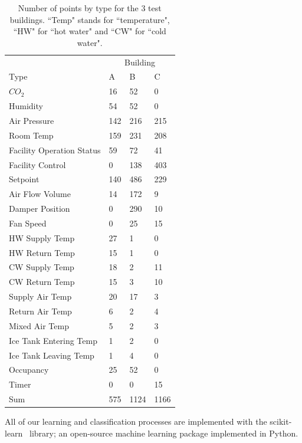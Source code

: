 \begin{table}[t]
\centering
\begin{tabular}{l | l l l}
\hline
& \multicolumn{3}{c}{Building} \\
Type & A & B & C\\
\hline\hline
$CO_{2}$ & 16 & 52 & 0\\
Humidity & 54 & 52 & 0\\
Air Pressure & 142 & 216 & 215\\
Room Temp & 159 & 231 & 208\\
Facility Operation Status & 59 & 72 & 41\\
Facility Control & 0 & 138 & 403\\
Setpoint & 140 & 486 & 229\\
Air Flow Volume & 14 & 172 & 9\\
Damper Position & 0 & 290 & 10\\
Fan Speed & 0 & 25 & 15\\
HW Supply Temp & 27 & 1 & 0\\
HW Return Temp & 15 & 1 & 0\\
CW Supply Temp & 18 & 2 & 11\\
CW Return Temp & 15 & 3 & 10\\
Supply Air Temp & 20 & 17 & 3\\
Return Air Temp & 6 & 2 & 4\\
Mixed Air Temp & 5 & 2 & 3\\
Ice Tank Entering Temp & 1 & 2 & 0\\
Ice Tank Leaving Temp & 1 & 4 & 0\\
Occupancy & 25 & 52 & 0\\
Timer & 0 & 0 & 15\\ \hline
Sum & 575 & 1124 & 1166\\ \hline
\end{tabular}
\caption{Number of points by type for the 3 test buildings. ``Temp" stands for ``temperature", ``HW" for ``hot water" and ``CW" for ``cold water".}
\label{table:num}
\end{table}


All of our learning and classification processes are implemented with the scikit-learn~\cite{scikit} library; an open-source machine learning package
implemented in Python. %


